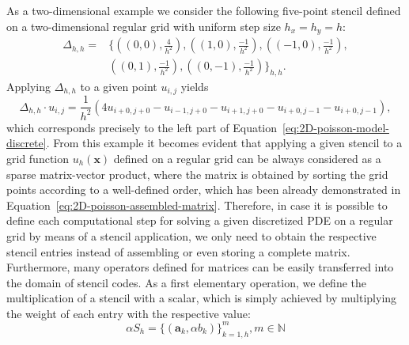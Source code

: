 As a two-dimensional example we consider the following five-point stencil defined on a two-dimensional regular grid with uniform step size $h_x = h_y = h$:
\begin{equation}
	\begin{split}
		\Delta_{h,h} = & \bigg\{ \left( \left( 0,0 \right), \frac{4}{h^2}\right), \left(\left(1,0\right), \frac{-1}{h^2}\right), \left(\left(-1,0\right), \frac{-1}{h^2}\right), \\ & \left(\left(0,1\right), \frac{-1}{h^2}\right), \left(\left(0,-1\right), \frac{-1}{h^2}\right) \bigg\}_{h,h}.
	\end{split}
	\label{eq:five-point-stencil}
\end{equation}
Applying $\Delta_{h,h}$ to a given point $u_{i,j}$ yields 
\begin{equation}
	\Delta_{h,h} \cdot u_{i,j} = \frac{1}{h^2} \left(4 u_{i+0,j+0}  - u_{i-1,j+0} - u_{i+1,j+0} - u_{i+0,j-1} - u_{i+0,j-1}\right),
\end{equation}
which corresponds precisely to the left part of Equation~\eqref{eq:2D-poisson-model-discrete}.
From this example it becomes evident that applying a given stencil to a grid function $u_h(\bm{x})$ defined on a regular grid can be always considered as a sparse matrix-vector product, where the matrix is obtained by sorting the grid points according to a well-defined order, which has been already demonstrated in Equation~\eqref{eq:2D-poisson-assembled-matrix}.
Therefore, in case it is possible to define each computational step for solving a given discretized PDE on a regular grid by means of a stencil application, we only need to obtain the respective stencil entries instead of assembling or even storing a complete matrix.
Furthermore, many operators defined for matrices can be easily transferred into the domain of stencil codes.
As a first elementary operation, we define the multiplication of a stencil with a scalar, which is simply achieved by multiplying the weight of each entry with the respective value:
\begin{equation}
	\alpha S_h = \{(\bm{a}_k, \alpha b_k) \}_{k=1, h}^m, m \in \mathbb{N}
\end{equation}


